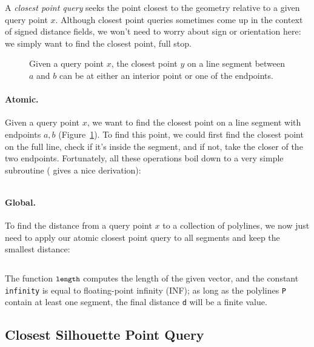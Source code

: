 \documentclass{article}
\newcommand{\code}[1]{\texttt{\small{#1}}}
\renewcommand{\vec}[1]{#1}
\begin{document}
A \emph{closest point query} seeks the point closest to the geometry relative to a given query point \(\vec{x}\).  Although closest point queries sometimes come up in the context of signed distance fields, we won't need to worry about sign or orientation here: we simply want to find the closest point, full stop.

\begin{figure}[h!]
   \centering
   
   
   \caption{Given a query point \(\vec{x}\), the closest point \(\vec{y}\) on a line segment between \(\vec{a}\) and \(\vec{b}\) can be at either an interior point or one of the endpoints.\label{fig:ClosestPointExamples}}
\end{figure}

\paragraph{Atomic.} Given a query point \(\vec{x}\), we want to find the closest point on a line segment with endpoints \(\vec{a}, \vec{b}\) (Figure~\ref{fig:ClosestPointExamples}).  To find this point, we could first find the closest point on the full line, check if it's inside the segment, and if not, take the closer of the two endpoints.  Fortunately, all these operations boil down to a very simple subroutine (\citet{Quilez:2020:SLS} gives a nice derivation):

\inputminted[fontsize=\small,linenos,firstline=36,lastline=41,bgcolor=bg]{cpp}{../code/WoStLaplace2D.cpp}

\paragraph{Global.} To find the distance from a query point \(x\) to a collection of polylines, we now just need to apply our atomic closest point query to all segments and keep the smallest distance:

\inputminted[fontsize=\small,linenos,firstline=65,lastline=75,bgcolor=bg]{cpp}{../code/WoStLaplace2D.cpp}
The function \(\code{length}\) computes the length of the given vector, and the constant \code{infinity} is equal to floating-point infinity (INF); as long as the polylines \code{P} contain at least one segment, the final distance \code{d} will be a finite value.

\subsection{Closest Silhouette Point Query}
\label{sec:ClosestSilhouettePointQuery}
\end{document}
